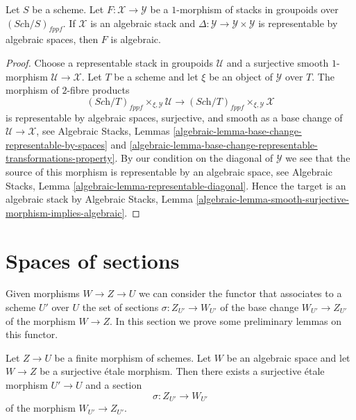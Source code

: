 \begin{lemma}
\label{lemma-map-from-algebraic}
Let $S$ be a scheme. Let $F : \mathcal{X} \to \mathcal{Y}$ be a $1$-morphism
of stacks in groupoids over $(\textit{Sch}/S)_{fppf}$. If $\mathcal{X}$ is an
algebraic stack and $\Delta : \mathcal{Y} \to \mathcal{Y} \times \mathcal{Y}$
is representable by algebraic spaces, then $F$ is algebraic.
\end{lemma}

\begin{proof}
Choose a representable stack in groupoids $\mathcal{U}$ and a surjective
smooth $1$-morphism $\mathcal{U} \to \mathcal{X}$. Let $T$ be a scheme and
let $\xi$ be an object of $\mathcal{Y}$ over $T$. The morphism of
$2$-fibre products
$$
(\textit{Sch}/T)_{fppf} \times_{\xi, \mathcal{Y}} \mathcal{U}
\longrightarrow
(\textit{Sch}/T)_{fppf} \times_{\xi, \mathcal{Y}} \mathcal{X}
$$
is representable by algebraic spaces, surjective, and smooth as a
base change of $\mathcal{U} \to \mathcal{X}$, see
Algebraic Stacks,
Lemmas \ref{algebraic-lemma-base-change-representable-by-spaces} and
\ref{algebraic-lemma-base-change-representable-transformations-property}.
By our condition on the diagonal of $\mathcal{Y}$ we see that
the source of this morphism is representable by an algebraic space, see
Algebraic Stacks, Lemma \ref{algebraic-lemma-representable-diagonal}.
Hence the target is an algebraic stack by
Algebraic Stacks,
Lemma \ref{algebraic-lemma-smooth-surjective-morphism-implies-algebraic}.
\end{proof}
















\section{Spaces of sections}
\label{section-spaces-sections}

\noindent
Given morphisms $W \to Z \to U$ we can consider the functor that associates
to a scheme $U'$ over $U$ the set of sections $\sigma : Z_{U'} \to W_{U'}$
of the base change $W_{U'} \to Z_{U'}$ of the morphism $W \to Z$.
In this section we prove some preliminary lemmas on this functor.

\begin{lemma}
\label{lemma-surjection-space-of-sections}
Let $Z \to U$ be a finite morphism of schemes.
Let $W$ be an algebraic space and let $W \to Z$ be a
surjective \'etale morphism. Then there exists a surjective
\'etale morphism $U' \to U$ and a section
$$
\sigma : Z_{U'} \to W_{U'}
$$
of the morphism $W_{U'} \to Z_{U'}$.
\end{lemma}

